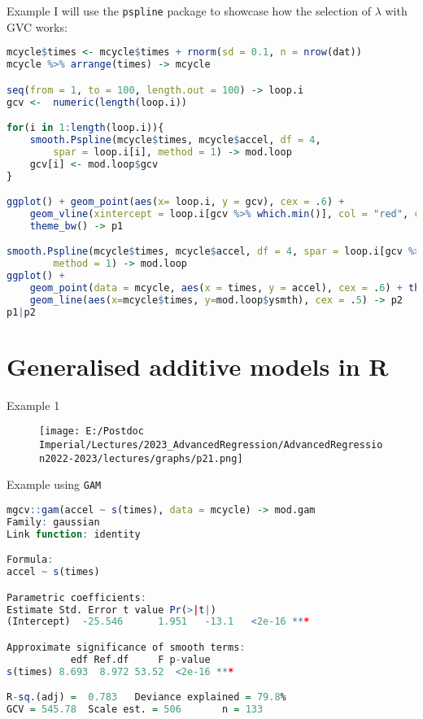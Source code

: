 \documentclass{beamer}
\begin{document}
\begin{frame}[fragile]{Example}
	I will use the \texttt{pspline} package to showcase how the selection of $\lambda$ with GVC works: \\
\begin{lstlisting}[language=R, basicstyle=\tiny]
mcycle$times <- mcycle$times + rnorm(sd = 0.1, n = nrow(dat))
mcycle %>% arrange(times) -> mcycle

seq(from = 1, to = 100, length.out = 100) -> loop.i
gcv <-  numeric(length(loop.i))

for(i in 1:length(loop.i)){
	smooth.Pspline(mcycle$times, mcycle$accel, df = 4, 
		spar = loop.i[i], method = 1) -> mod.loop
	gcv[i] <- mod.loop$gcv
}

ggplot() + geom_point(aes(x= loop.i, y = gcv), cex = .6) + 
	geom_vline(xintercept = loop.i[gcv %>% which.min()], col = "red", cex = .5) + 
	theme_bw() -> p1

smooth.Pspline(mcycle$times, mcycle$accel, df = 4, spar = loop.i[gcv %>% which.min()],
        method = 1) -> mod.loop
ggplot() + 
	geom_point(data = mcycle, aes(x = times, y = accel), cex = .6) + theme_bw() + 
	geom_line(aes(x=mcycle$times, y=mod.loop$ysmth), cex = .5) -> p2
p1|p2
\end{lstlisting}
\end{frame}

\section{Generalised additive models in R}

\begin{frame}[fragile]{Example 1}
	\begin{figure}
		\texttt{[image: E:/Postdoc Imperial/Lectures/2023\_AdvancedRegression/AdvancedRegression2022-2023/lectures/graphs/p21.png]}
	\end{figure}
\end{frame}

\begin{frame}[fragile]{Example using \texttt{GAM}}
	\begin{lstlisting}[language=R, basicstyle=\tiny]
mgcv::gam(accel ~ s(times), data = mcycle) -> mod.gam
Family: gaussian 
Link function: identity 

Formula:
accel ~ s(times)

Parametric coefficients:
Estimate Std. Error t value Pr(>|t|)    
(Intercept)  -25.546      1.951   -13.1   <2e-16 ***

Approximate significance of smooth terms:
           edf Ref.df     F p-value    
s(times) 8.693  8.972 53.52  <2e-16 ***

R-sq.(adj) =  0.783   Deviance explained = 79.8%
GCV = 545.78  Scale est. = 506       n = 133
	\end{lstlisting}
\end{frame}
\end{document}
